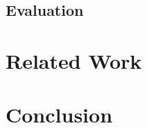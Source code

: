\documentclass{acm_proc_article-sp}
\begin{document}
\subsection{Evaluation}

\section{Related Work} \label{related}


\section{Conclusion} \label{conclusion}




%

%
%
\end{document}
